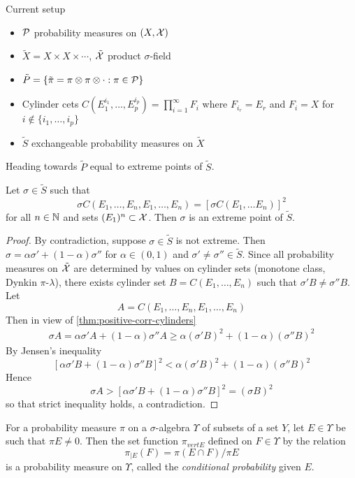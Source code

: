 
Current setup
\begin{itemize}
  \item $\mathcal{P}$ probability measures on $(X, \mathcal{X})$
  \item $\tilde{X} = X \times X \times \cdots$, $\tilde{\mathcal{X}}$ product $\sigma$-field
  \item $\tilde{P} = \{ \tilde{\pi} = \pi \otimes \pi \otimes \cdot : \pi \in \mathcal{P} \}$
  \item Cylinder cets $C(E_1^{i_1}, \ldots, E_p^{i_p}) = \prod_{i=1}^\infty F_i$ where $F_{i_r} = E_r$
    and $F_i = X$ for $i \not\in \{ i_1, \ldots, i_p\}$
  \item $\tilde{S}$ exchangeable probability measures on $\tilde{X}$
\end{itemize}
Heading towards $\tilde{P}$ equal to extreme points of $\tilde{S}$.

\begin{theorem}
  \label{thm:equality-implies-extreme}
  Let $\sigma \in \tilde{S}$ such that
  \[
    \sigma C(E_1, \ldots, E_n, E_1, \ldots, E_n)
    = [\sigma C(E_1, \ldots E_n)]^2
  \]
  for all $n \in \mathbb{N}$ and sets $(E_1)^n \subset \mathcal{X}$. Then $\sigma$ is
  an extreme point of $\tilde{S}$.
\end{theorem}

\begin{proof}
  By contradiction, suppose $\sigma \in \tilde{S}$ is not extreme.
  Then $\sigma = \alpha \sigma' + (1 - \alpha) \sigma''$ for $\alpha \in (0,1)$
  and $\sigma' \neq \sigma'' \in \tilde{S}$.
  Since all probability measures on $\tilde{\mathcal{X}}$ are determined by values on
  cylinder sets (monotone class, Dynkin $\pi$-$\lambda$), there exists
  cylinder set $B = C(E_1,\ldots,E_n)$ such that $\sigma' B \neq \sigma'' B$.
  Let
  \[
    A = C(E_1, \ldots, E_n, E_1, \ldots, E_n)
  \]
  Then in view of \cref{thm:positive-corr-cylinders}
  \begin{align*}
    \sigma A = \alpha \sigma' A + (1 - \alpha) \sigma'' A
    \geq \alpha (\sigma' B)^2 + (1 - \alpha) (\sigma'' B)^2
  \end{align*}
  By Jensen's inequality
  \[
    [\alpha \sigma' B + (1 - \alpha) \sigma'' B]^2
    < \alpha (\sigma' B)^2 + (1 - \alpha) (\sigma'' B)^2
  \]
  Hence
  \[
    \sigma A > [\alpha \sigma' B + (1 -\alpha) \sigma'' B]^2 = (\sigma B)^2
  \]
  so that strict inequality holds, a contradiction.
\end{proof}

\begin{definition}
  For a probability measure $\pi$ on a $\sigma$-algebra
  $\Upsilon$ of subsets of a set $Y$, let $E \in \Upsilon$ be
  such that $\pi E \neq 0$. Then the set function $\pi_{vert E}$
  defined on $F \in \Upsilon$ by the relation
  \[
    \pi_{\vert E}(F) = \pi(E \cap F) / \pi E
  \]
  is a probability measure on $\Upsilon$, called the \emph{conditional probability}
  given $E$.
\end{definition}

